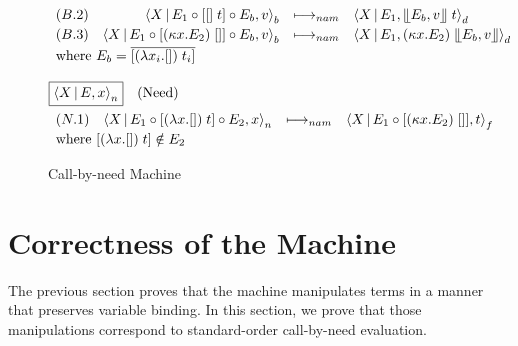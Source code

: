 \documentclass{LMCS}
\newcommand{\desc}[1]{\ensuremath{\text{(#1)}}}
\newenvironment{ltransitionrule}
  {\begin{array}{lrcll}}
  {\end{array}}
\newenvironment{boxedarray}[1]
  {\begin{lrbox}{\saveboxedarray}\begin{math}\begin{array}{#1}}
  {\end{array}\end{math}\end{lrbox}\fbox{\usebox{\saveboxedarray}}}
\theoremstyle{plain}
\theoremstyle{remark}
\newcommand{\nam}[0]{\ensuremath{\longmapsto_{nam}}}
\renewcommand{\comp}[0]{\ensuremath{\circ}}
\newcommand{\answer}[1]{\llfloor#1\rrfloor}
\newcommand{\refocus}[1]{\Braket{#1}_f}
\newcommand{\rebuild}[1]{\Braket{#1}_b}
\newcommand{\reduce}[1]{\Braket{#1}_d}
\newcommand{\need}[1]{\Braket{#1}_n}
\begin{document}
\begin{figure*}
\begin{boxedarray}{@{}l@{}}
\begin{ltransitionrule}
      (B.2) &
      \rebuild{X | E_1 \comp [[]\; t] \comp E_b, v} & \nam &
      \reduce{X | E_1, \answer{E_b,v}\; t} & \\[0.5ex]
      
      (B.3) &
      \rebuild{X | E_1 \comp [(\kappa x.E_2)\; []]\comp E_b, v} & \nam &
      \reduce{X | E_1, (\kappa x.E_2)\; \answer{E_b,v}} & \\[0.5ex]
      \multicolumn{5}{l}{\text{where }E_b = \overline{[(\lambda x_i.[])\;t_i]}}
    \end{ltransitionrule} \\  \\

    \vspace{1ex}
    \boxed{\need{X|E,x}}\quad\desc{Need} \\
    \begin{ltransitionrule}
      (N.1) &
      \need{X | E_1 \comp [(\lambda x.[])\; t] \comp E_2, x} & \nam &
      \refocus{X | E_1 \comp [(\kappa x.E_2)\; []], t}  & \\[0.5ex]
      \multicolumn{5}{l}{\text{where }\lbrack(\lambda x.[])\; t] \notin E_2}
    \end{ltransitionrule}
 \end{boxedarray}
   \caption{Call-by-need Machine}
  \label{fig:transitions}
\end{figure*}






\section{Correctness of the Machine}

The previous section proves that the machine manipulates terms in a manner that
preserves variable binding. In this section, we prove that those manipulations
correspond to standard-order call-by-need evaluation.  
\end{document}
